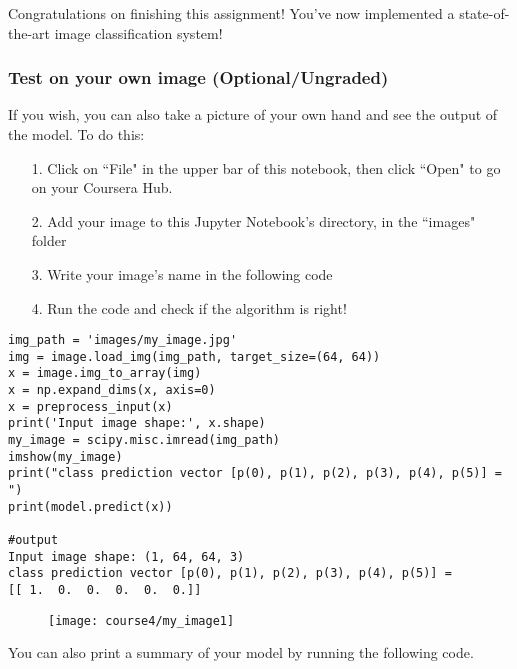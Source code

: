 Congratulations on finishing this assignment! You've now implemented a state-of-the-art image classification system!



\subsubsection{Test on your own image (Optional/Ungraded)}
If you wish, you can also take a picture of your own hand and see the output of the model. To do this:
\begin{itemize}
\item[1.] Click on ``File" in the upper bar of this notebook, then click ``Open" to go on your Coursera Hub.
\item[2.] Add your image to this Jupyter Notebook's directory, in the ``images" folder
\item[3.] Write your image's name in the following code
\item[4.] Run the code and check if the algorithm is right!
\end{itemize}

\begin{verbatim}
img_path = 'images/my_image.jpg'
img = image.load_img(img_path, target_size=(64, 64))
x = image.img_to_array(img)
x = np.expand_dims(x, axis=0)
x = preprocess_input(x)
print('Input image shape:', x.shape)
my_image = scipy.misc.imread(img_path)
imshow(my_image)
print("class prediction vector [p(0), p(1), p(2), p(3), p(4), p(5)] = ")
print(model.predict(x))

#output
Input image shape: (1, 64, 64, 3)
class prediction vector [p(0), p(1), p(2), p(3), p(4), p(5)] = 
[[ 1.  0.  0.  0.  0.  0.]]
\end{verbatim}


\begin{figure}[h]
\begin{center}
\texttt{[image: course4/my\_image1]}
\end{center}
\end{figure}

You can also print a summary of your model by running the following code.

